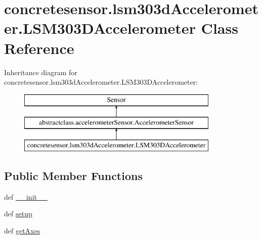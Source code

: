 \hypertarget{classconcretesensor_1_1lsm303dAccelerometer_1_1LSM303DAccelerometer}{}\section{concretesensor.\+lsm303d\+Accelerometer.\+L\+S\+M303\+D\+Accelerometer Class Reference}
\label{classconcretesensor_1_1lsm303dAccelerometer_1_1LSM303DAccelerometer}
Inheritance diagram for concretesensor.\+lsm303d\+Accelerometer.\+L\+S\+M303\+D\+Accelerometer\+:\begin{figure}[H]
\begin{center}
\leavevmode
\includegraphics[height=3.000000cm]{classconcretesensor_1_1lsm303dAccelerometer_1_1LSM303DAccelerometer}
\end{center}
\end{figure}
\subsection*{Public Member Functions}
\begin{DoxyCompactItemize}
\item 
def \hyperlink{classconcretesensor_1_1lsm303dAccelerometer_1_1LSM303DAccelerometer_ac5af148a89c16ca280fd1e01f5eb3917}{\+\_\+\+\_\+init\+\_\+\+\_\+}
\item 
def \hyperlink{classconcretesensor_1_1lsm303dAccelerometer_1_1LSM303DAccelerometer_a2fceca9da2c52225a4b1f20f0bd9482c}{setup}
\item 
def \hyperlink{classconcretesensor_1_1lsm303dAccelerometer_1_1LSM303DAccelerometer_aa884cf2a21ab4e6e4bef2396ed6b3308}{get\+Axes}
\end{DoxyCompactItemize}
